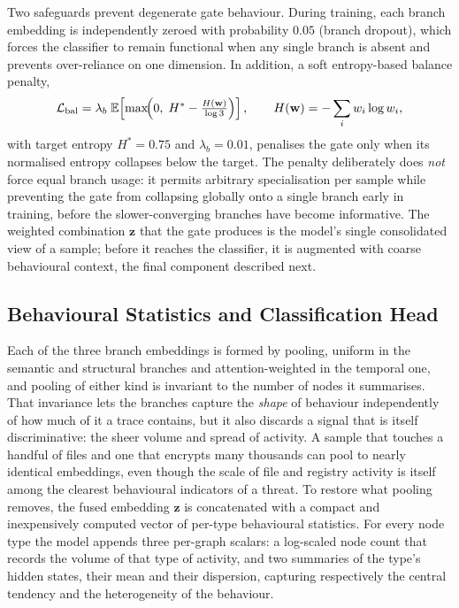 \documentclass[%
    BCOR=10mm,
    DIV=13,
    toc=bibliography,
    toc=listof,
    oneside,
    12pt,
]{scrbook}
\begin{document}
Two safeguards prevent degenerate gate behaviour. During training, each branch
embedding is independently zeroed with probability $0.05$ (branch dropout),
which forces the classifier to remain functional when any single branch is
absent and prevents over-reliance on one dimension. In addition, a soft
entropy-based balance penalty,
\begin{equation}
  \mathcal{L}_{\mathrm{bal}}
  = \lambda_{b}\;
    \mathbb{E}\!\left[
      \max\!\Bigl( 0,\; H^{*} - \tfrac{H(\mathbf{w})}{\log 3} \Bigr)
    \right],
  \qquad
  H(\mathbf{w}) = -\sum_{i} w_i \log w_i,
  \label{eq:branch_balance}
\end{equation}
with target entropy $H^{*} = 0.75$ and $\lambda_b = 0.01$, penalises the gate
only when its normalised entropy collapses below the target. The penalty
deliberately does \emph{not} force equal branch usage: it permits arbitrary
specialisation per sample while preventing the gate from collapsing globally
onto a single branch early in training, before the slower-converging branches
have become informative. The weighted combination $\mathbf{z}$ that the gate
produces is the model's single consolidated view of a sample; before it reaches
the classifier, it is augmented with coarse behavioural context, the final
component described next.

\subsection{Behavioural Statistics and Classification Head}
\label{subsec:classifier}

Each of the three branch embeddings is formed by pooling, uniform in the
semantic and structural branches and attention-weighted in the temporal one, and
pooling of either kind is invariant to the number of nodes it summarises. That
invariance lets the branches capture the \emph{shape} of behaviour independently
of how much of it a trace contains, but it also discards a signal that is itself
discriminative: the sheer volume and spread of activity. A sample that touches a
handful of files and one that encrypts many thousands can pool to nearly
identical embeddings, even though the scale of file and registry activity is
itself among the clearest behavioural indicators of a threat. To restore what
pooling removes, the fused embedding $\mathbf{z}$ is concatenated with a compact
and inexpensively computed vector of per-type behavioural statistics. For every
node type the model appends three per-graph scalars: a log-scaled node count
that records the volume of that type of activity, and two summaries of the
type's hidden states, their mean and their dispersion, capturing respectively
the central tendency and the heterogeneity of the behaviour.
\end{document}
